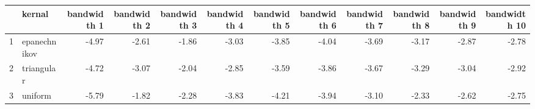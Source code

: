 \begin{tabular}{rlrrrrrrrrrr}
  \hline
 & kernal & bandwidth 1 & bandwidth 2 & bandwidth 3 & bandwidth 4 & bandwidth 5 & bandwidth 6 & bandwidth 7 & bandwidth 8 & bandwidth 9 & bandwidth 10 \\ 
  \hline
1 & epanechnikov & -4.97 & -2.61 & -1.86 & -3.03 & -3.85 & -4.04 & -3.69 & -3.17 & -2.87 & -2.78 \\ 
  2 & triangular & -4.72 & -3.07 & -2.04 & -2.85 & -3.59 & -3.86 & -3.67 & -3.29 & -3.04 & -2.92 \\ 
  3 & uniform & -5.79 & -1.82 & -2.28 & -3.83 & -4.21 & -3.94 & -3.10 & -2.33 & -2.62 & -2.75 \\ 
   \hline
\end{tabular}

